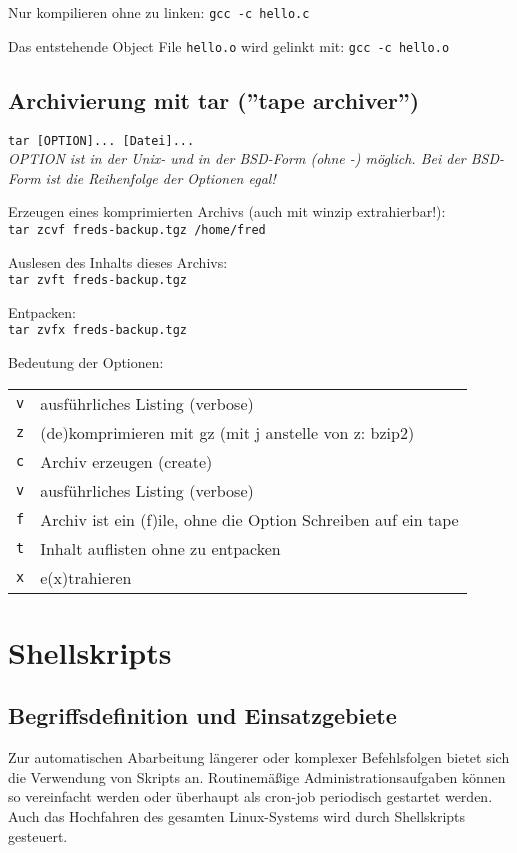 \documentclass[11pt]{article}
\begin{document}
Nur kompilieren ohne zu linken:
\texttt{gcc -c hello.c}

Das entstehende Object File \texttt{hello.o} wird gelinkt mit:
\texttt{gcc -c hello.o}

\subsection{Archivierung mit tar (''tape archiver'')}
\texttt{tar [OPTION]... [Datei]...}\\
\textit{OPTION ist in der Unix- und in der BSD-Form (ohne -) möglich.
  Bei der BSD-Form ist die Reihenfolge der Optionen egal!}

Erzeugen eines komprimierten Archivs (auch mit winzip extrahierbar!):\\
\texttt{tar zcvf freds-backup.tgz /home/fred}

Auslesen des Inhalts dieses Archivs:\\
\texttt{tar zvft freds-backup.tgz}

Entpacken:\\
\texttt{tar zvfx freds-backup.tgz}

Bedeutung der Optionen:\\
\begin{tabular}{|ll|}
\hline
\texttt{v} & ausführliches Listing (verbose) \\
\texttt{z} & (de)komprimieren mit gz (mit j anstelle von z: bzip2)\\
\texttt{c} & Archiv erzeugen (create) \\
\texttt{v} & ausführliches Listing (verbose) \\
\texttt{f} & Archiv ist ein (f)ile, ohne die Option Schreiben auf ein tape \\
\texttt{t} & Inhalt auflisten ohne zu entpacken \\
\texttt{x} & e(x)trahieren \\
\hline
\end{tabular}

\section{Shellskripts} 
\subsection{Begriffsdefinition und Einsatzgebiete}
Zur automatischen Abarbeitung längerer oder komplexer Befehlsfolgen
bietet sich die Verwendung von Skripts an. Routinemäßige
Administrationsaufgaben können so vereinfacht werden oder überhaupt
als cron-job periodisch gestartet werden. Auch das Hochfahren des
gesamten Linux-Systems wird durch Shellskripts gesteuert.  
\end{document}
